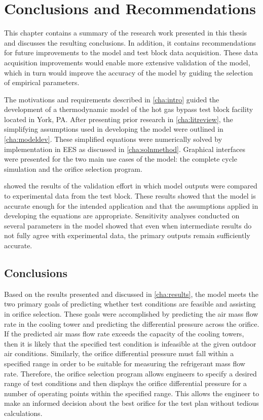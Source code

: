 \chapter{Conclusions and Recommendations} \label{cha:conclusion}
This chapter contains a summary of the research work presented in this thesis
and discusses the resulting conclusions.
In addition, it contains recommendations for future improvements to the model
and test block data acquisition.
These data acquisition improvements would enable more extensive validation of the model, 
which in turn would improve the accuracy of the model by guiding the selection
of empirical parameters.

The motivations and requirements described in \cref{cha:intro} guided the development
of a thermodynamic model of the  hot gas bypass test block
facility located in York, PA.
After presenting prior research in \cref{cha:litreview}, the simplifying assumptions 
used in developing the model were outlined in \cref{cha:modeldev}.
These simplified equations were numerically solved by implementation
in EES as discussed in \cref{cha:solnmethod}.
Graphical interfaces were presented for the two main use cases of the model:
the complete cycle simulation and the orifice selection program.

 showed the results of the validation effort
in which model outputs were compared to experimental data from the test block.
These results showed that the model is accurate enough for the intended application
and that the assumptions applied in developing the equations are appropriate.
Sensitivity analyses conducted on several parameters in the model showed that
even when intermediate results do not fully agree with experimental data,
the primary outputs remain sufficiently accurate.

\section{Conclusions} \label{sec:conclusions}
Based on the results presented and discussed in \cref{cha:results},
the model meets the two primary goals of predicting whether test conditions
are feasible and assisting in orifice selection.
These goals were accomplished by predicting the air mass flow rate in the
cooling tower and predicting the differential pressure across the orifice.
If the predicted air mass flow rate exceeds the capacity of the cooling towers,
then it is likely that the specified test condition is infeasible at the given
outdoor air conditions.
Similarly, the orifice differential pressure must fall within a specified range
in order to be suitable for measuring the refrigerant mass flow rate.
Therefore, the orifice selection program allows engineers to specify
a desired range of test conditions and
then displays the orifice differential pressure for 
a number of operating points within the specified range.
This allows the engineer to make an informed decision about the best orifice 
for the test plan without tedious calculations.

